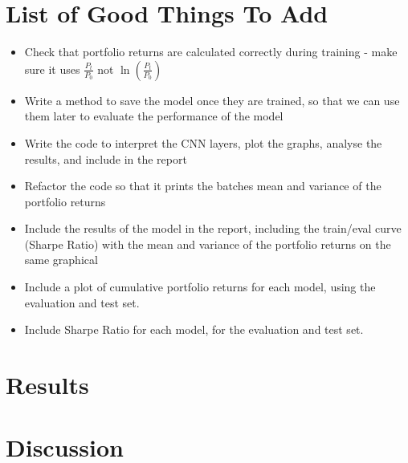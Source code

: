 \documentclass[12pt]{article}
\begin{document}
\section*{List of Good Things To Add}
\begin{itemize}
    \item Check that portfolio returns are calculated correctly during training - make sure it uses $\frac{P_t}{P_0}$ not $\ln\left(\frac{P_t}{P_0}\right)$
    \item Write a method to save the model once they are trained, so that we can use them later to evaluate the performance of the model
    \item Write the code to interpret the CNN layers, plot the graphs, analyse the results, and include in the report
    \item Refactor the code so that it prints the batches mean and variance of the portfolio returns
    \item Include the results of the model in the report, including the train/eval curve (Sharpe Ratio) with the mean and variance of the portfolio returns on the same graphical
    \item Include a plot of cumulative portfolio returns for each model, using the evaluation and test set.
    \item Include Sharpe Ratio for each model, for the evaluation and test set.
\end{itemize}


\clearpage




\section{Results}

\clearpage





\section{Discussion}
\clearpage
\end{document}
